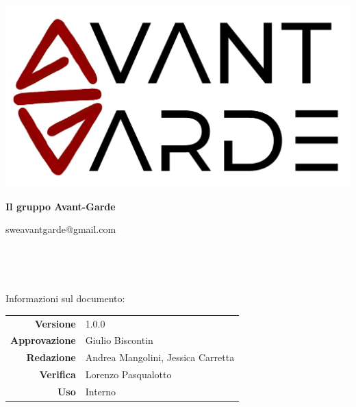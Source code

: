     \begin{titlepage}
        \begin{center}
            \includegraphics[width=\textwidth]{logo+scritta.png}

            \vspace{0.5cm}
            {\huge \textbf{Il gruppo Avant-Garde}}

            \vspace{0.4cm}
            \large{sweavantgarde@gmail.com}

            \vspace{1.5cm}
            \hrulefill\\
            \vspace{0.2cm}
            
            \textbf{\titoloDocumento}\\
           
            \hrulefill

            \vfill
            Informazioni sul documento:\\
            \vspace{0.3cm}
                \begin{tabular}{ r | l }
                    \textbf{Versione} & 1.0.0\\ %
                    \textbf{Approvazione} & Giulio Biscontin\\ %
                    \textbf{Redazione} & Andrea Mangolini, Jessica Carretta\\ %
                    \textbf{Verifica} & Lorenzo Pasqualotto\\ %
                    \textbf{Uso} & Interno\\ %
                \end{tabular}
        \end{center}
    \end{titlepage}
\restoregeometry